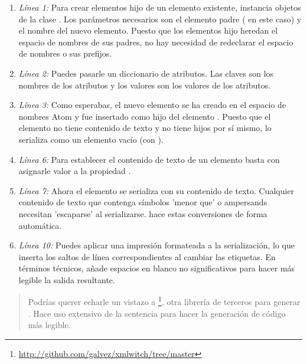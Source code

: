\begin{enumerate}

\item \emph{Línea 1:} Para crear elementos hijo de un elemento existente, instancia objetos de la clase . Los parámetros necesarios son el elemento padre ( en este caso) y el nombre del nuevo elemento. Puesto que los elementos hijo heredan el espacio de nombres de sus padres, no hay necesidad de redeclarar el espacio de nombres o sus prefijos.

\item \emph{Línea 2:} Puedes pasarle un diccionario de atributos. Las claves son los nombres de los atributos y los valores son los valores de los atributos.

\item \emph{Línea 3:} Como esperabas, el nuevo elemento  se ha creado en el espacio de nombres Atom y fue insertado como hijo del elemento . Puesto que el elemento  no tiene contenido de texto y no tiene hijos por sí mismo,  lo serializa como un elemento vacío (con \codigo{/>}).

\item \emph{Línea 6:} Para establecer el contenido de texto de un elemento basta con asignarle valor a la propiedad .

\item \emph{Línea 7:} Ahora el elemento  se serializa con su contenido de texto. Cualquier contenido de texto que contenga símbolos 'menor que' o ampersands necesitan 'escaparse' al serializarse.  hace estas conversiones de forma automática.

\item \emph{Línea 10:} Puedes aplicar una impresión formateada a la serialización, lo que inserta los saltos de línea correspondientes al cambiar las etiquetas. En términos técnicos,  añade espacios en blanco no significativos para hacer más legible la salida resultante.

\end{enumerate}
\begin{quote}
Podrías querer echarle un vistazo a \footnote{\href{http://github.com/galvez/xmlwitch/tree/master}{http://github.com/galvez/xmlwitch/tree/master}}, otra librería de terceros para generar . Hace uso extensivo de la sentencia  para hacer la generación de código  más legible.
\end{quote}

